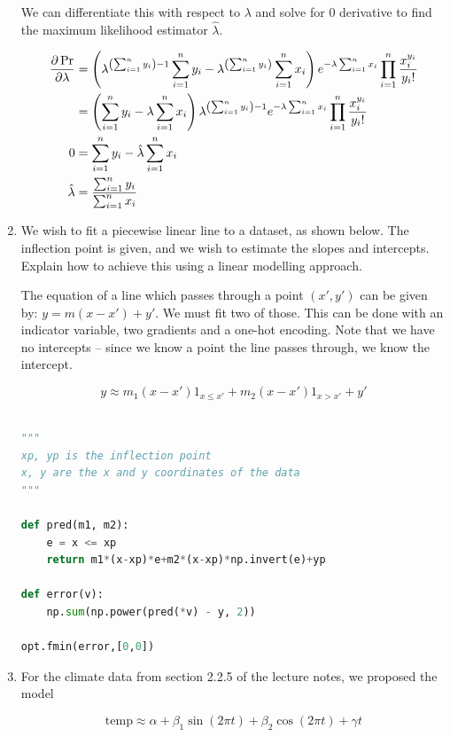 \documentclass[10pt,\jkfside,a4paper]{article}
\begin{document}
\begin{enumerate}
We can differentiate this with respect to $\lambda$ and solve for 0
derivative to find the maximum likelihood estimator $\hat{\lambda}$.

\[
\begin{split}
\pdv{\Pr}{\lambda} &=
\left(\lambda^{\left( \sum^n_{i=1}y_i \right) - 1}\sum^n_{i=1}y_i -
\lambda^{\left( \sum^n_{i=1}y_i \right)}\sum^n_{i=1} x_i\right)e^{-\lambda
\sum^n_{i=1}x_i } \prod^n_{i=1}\frac{x_i^{y_i}}{y_i!} \\
&= \left( \sum^n_{i=1}y_i - \lambda\sum^n_{i=1} x_i\right) \lambda^{\left(
\sum^n_{i=1}y_i \right)- 1}e^{-\lambda\sum^n_{i=1}x_i }
\prod^n_{i=1}\frac{x_i^{y_i}}{y_i!} \\
0 &= \sum^n_{i=1}y_i - \hat{\lambda}\sum^n_{i=1} x_i \\
\hat{\lambda} &= \frac{\sum^n_{i=1}y_i}{\sum^n_{i=1} x_i} \\
\end{split}
\]

\item We wish to fit a piecewise linear line to a dataset, as shown below.
The inflection point is given, and we wish to estimate the slopes and
intercepts. Explain how to achieve this using a linear modelling approach.

The equation of a line which passes through a point $(x', y')$ can be given by:
$y = m(x - x') + y'$. We must fit two of those. This can be done with an
indicator variable, two gradients and a one-hot encoding. Note that we have
no intercepts -- since we know a point the line passes through, we know the
intercept.

\[
y \approx m_1 (x - x') 1_{x\leq x'} + m_2 (x - x') 1_{x > x'} + y'
\]

\begin{lstlisting}[language=Python]

"""
xp, yp is the inflection point
x, y are the x and y coordinates of the data
"""

def pred(m1, m2):
	e = x <= xp
	return m1*(x-xp)*e+m2*(x-xp)*np.invert(e)+yp

def error(v):
	np.sum(np.power(pred(*v) - y, 2))

opt.fmin(error,[0,0])

\end{lstlisting}

\item For the climate data from section 2.2.5 of the lecture notes, we
proposed the model

\[
\text{temp} \approx \alpha + \beta_1\sin(2\pi t) + \beta_2\cos(2\pi t) +
\gamma t
\]


\end{enumerate}
\end{document}
